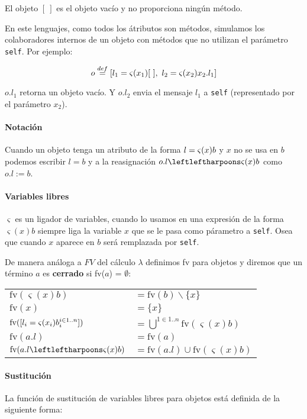 \vspace*{5mm}
El objeto $[~]$ es el objeto vacío y no proporciona ningún método.

En este lenguajes, como todos los átributos son métodos, simulamos los colaboradores internos de un objeto con métodos que no utilizan el parámetro \texttt{self}. Por ejemplo:

$$o \overset{def}{=} [l_1 = \varsigma(x_1)[~],~
				l_2 = \varsigma(x_2)x_2.l_1]$$

$o.l_1$ retorna un objeto vacío. Y $o.l_2$ envia el mensaje $l_1$ a \texttt{self} (representado por el parámetro $x_2$). 

\paragraph{Notación} Cuando un objeto tenga un atributo de la forma $l = \varsigma(x)b$ y $x$ no se usa en $b$ podemos escribir $l = b$ y a la reasignación $\OORedefinicion{o.l}{x}{b}$ como $o.l := b$.

\paragraph{Variables libres}
$\varsigma$ es un ligador de variables, cuando lo usamos en una expresión de la forma $\varsigma(x)b$ siempre liga la variable $x$ que se le pasa como párametro a \texttt{self}. Osea que cuando $x$ aparece en $b$ será remplazada por \texttt{self}.

De manera análoga a $FV$ del cálculo $\lambda$ definimos fv para objetos y diremos que un término $a$ es \textbf{cerrado} si fv($a$) = $\emptyset$:

\begin{center}
\begin{tabular}{ll}
	$\text{fv}(\varsigma(x)b)$ &$= \text{fv}(b)\backslash \{x\} $\\
	$\text{fv}(x)$ &$= \{x\} $\\
	$\text{fv}([l_i = \varsigma(x_i)b_i^{i\in 1..n}])$ &$=  \bigcup^{1\in 1..n} \text{fv}(\varsigma(x)b)$\\
	$\text{fv}(a.l)$ &$= \text{fv}(a) $\\
	$\text{fv}(\OORedefinicion{a.l}{x}{b})$ &$= \text{fv}(a.l)\cup \text{fv}(\varsigma(x)b) $\\
\end{tabular}
\end{center}
\paragraph{Sustitución} La función de sustitución de variables libres para objetos está definida de la siguiente forma:

